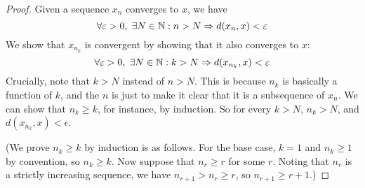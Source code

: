 \begin{proof}
  Given a sequence $x_n$ converges to $x$, we have
  \[
    \forall \varepsilon > 0, \; \exists N \in \mathbb{N}: n > N \Rightarrow d(x_n, x) < \varepsilon
  \]
  We show that $x_{n_k}$ is convergent by showing that it also converges to $x$:
  \[
    \forall \varepsilon > 0, \; \exists N \in \mathbb{N}: k > N \Rightarrow d(x_{n_k}, x) < \varepsilon
  \]
  Crucially, note that $k > N$ instead of $n > N$. This is because $n_k$ is basically a function of $k$, and the $n$ is just to make it clear that it is a subsequence of $x_n$. We can show that $n_k \geq k$, for instance, by induction. So for every $k > N$, $n_k > N$, and $d(x_{n_k}, x) < \epsilon$.

  (We prove $n_k \geq k$ by induction is as follows. For the base case, $k = 1$ and $n_k \geq 1$ by convention, so $n_k \geq k$. Now suppose that $n_r \geq r$ for some $r$. Noting that $n_r$ is a strictly increasing sequence, we have $n_{r + 1} > n_r \geq r$, so $n_{r + 1} \geq r + 1$.)
\end{proof}


